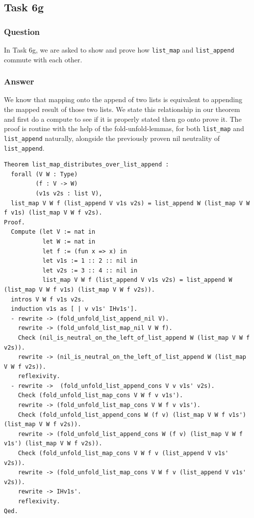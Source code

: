 \documentclass{article}
\begin{document}
\subsection{Task 6g}

\subsubsection{Question}
In Task 6g, we are asked to show and prove how \texttt{list\_map} and \texttt{list\_append} commute with each other.

\subsubsection{Answer}
We know that mapping onto the append of two lists is equivalent to appending the mapped result of those two lists. We state this relationship in our theorem and first do a compute to see if it is properly stated then go onto prove it. The proof is routine with the help of the fold-unfold-lemmas, for both \texttt{list\_map} and \texttt{list\_append} naturally, alongside the previously proven nil neutrality of \texttt{list\_append}.

\begin{lstlisting}
Theorem list_map_distributes_over_list_append :
  forall (V W : Type)
         (f : V -> W)
         (v1s v2s : list V),
  list_map V W f (list_append V v1s v2s) = list_append W (list_map V W f v1s) (list_map V W f v2s).
Proof.
  Compute (let V := nat in
           let W := nat in
           let f := (fun x => x) in
           let v1s := 1 :: 2 :: nil in
           let v2s := 3 :: 4 :: nil in
           list_map V W f (list_append V v1s v2s) = list_append W (list_map V W f v1s) (list_map V W f v2s)).
  intros V W f v1s v2s.
  induction v1s as [ | v v1s' IHv1s'].
  - rewrite -> (fold_unfold_list_append_nil V). 
    rewrite -> (fold_unfold_list_map_nil V W f).
    Check (nil_is_neutral_on_the_left_of_list_append W (list_map V W f v2s)).
    rewrite -> (nil_is_neutral_on_the_left_of_list_append W (list_map V W f v2s)).
    reflexivity.
  - rewrite ->  (fold_unfold_list_append_cons V v v1s' v2s).
    Check (fold_unfold_list_map_cons V W f v v1s'). 
    rewrite -> (fold_unfold_list_map_cons V W f v v1s').
    Check (fold_unfold_list_append_cons W (f v) (list_map V W f v1s') (list_map V W f v2s)).
    rewrite -> (fold_unfold_list_append_cons W (f v) (list_map V W f v1s') (list_map V W f v2s)).
    Check (fold_unfold_list_map_cons V W f v (list_append V v1s' v2s)).
    rewrite -> (fold_unfold_list_map_cons V W f v (list_append V v1s' v2s)).
    rewrite -> IHv1s'.
    reflexivity.
Qed.
\end{lstlisting}
\end{document}
